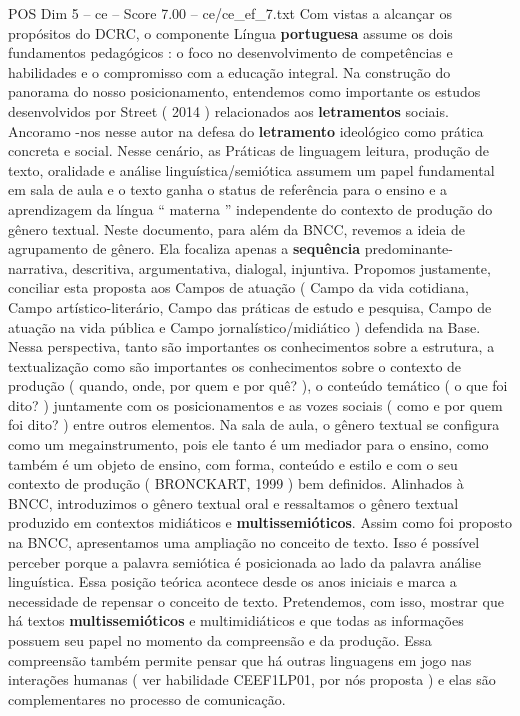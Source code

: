 \begin{textsample}{POS Dim 5 – ce – Score 7.00 – ce/ce\_ef\_7.txt}
Com vistas a alcançar os propósitos do DCRC, o componente Língua \textbf{portuguesa} assume os dois fundamentos pedagógicos : o foco no desenvolvimento de competências e habilidades e o compromisso com a educação integral.
Na construção do panorama do nosso posicionamento, entendemos como importante os estudos desenvolvidos por Street ( 2014 ) relacionados aos \textbf{letramentos} sociais.
Ancoramo -nos nesse autor na defesa do \textbf{letramento} ideológico como prática concreta e social.
Nesse cenário, as Práticas de linguagem leitura, produção de texto, oralidade e análise linguística/semiótica assumem um papel fundamental em sala de aula e o texto ganha o status de referência para o ensino e a aprendizagem da língua “ materna ” independente do contexto de produção do gênero textual.
Neste documento, para além da BNCC, revemos a ideia de agrupamento de gênero.
Ela focaliza apenas a \textbf{sequência} predominante-narrativa, descritiva, argumentativa, dialogal, injuntiva.
Propomos justamente, conciliar esta proposta aos Campos de atuação ( Campo da vida cotidiana, Campo artístico-literário, Campo das práticas de estudo e pesquisa, Campo de atuação na vida pública e Campo jornalístico/midiático ) defendida na Base.
Nessa perspectiva, tanto são importantes os conhecimentos sobre a estrutura, a textualização como são importantes os conhecimentos sobre o contexto de produção ( quando, onde, por quem e por quê? ), o conteúdo temático ( o que foi dito? ) juntamente com os posicionamentos e as vozes sociais ( como e por quem foi dito? ) entre outros elementos.
Na sala de aula, o gênero textual se configura como um megainstrumento, pois ele tanto é um mediador para o ensino, como também é um objeto de ensino, com forma, conteúdo e estilo e com o seu contexto de produção ( BRONCKART, 1999 ) bem definidos.
Alinhados à BNCC, introduzimos o gênero textual oral e ressaltamos o gênero textual produzido em contextos midiáticos e \textbf{multissemióticos}.
Assim como foi proposto na BNCC, apresentamos uma ampliação no conceito de texto.
Isso é possível perceber porque a palavra semiótica é posicionada ao lado da palavra análise linguística.
Essa posição teórica acontece desde os anos iniciais e marca a necessidade de repensar o conceito de texto.
Pretendemos, com isso, mostrar que há textos \textbf{multissemióticos} e multimidiáticos e que todas as informações possuem seu papel no momento da compreensão e da produção.
Essa compreensão também permite pensar que há outras linguagens em jogo nas interações humanas ( ver habilidade CEEF1LP01, por nós proposta ) e elas são complementares no processo de comunicação.

\end{textsample}
